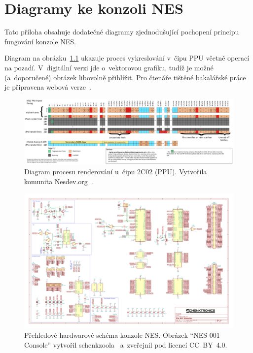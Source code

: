 \chapter{Diagramy ke konzoli NES}
\label{apx:ppu}

Tato příloha obsahuje dodatečné diagramy zjednodušující pochopení principu fungování konzole NES.

Diagram na obrázku~\ref{fig:ppu-renderovani} ukazuje proces vykreslování v~čipu PPU včetně operací na pozadí. V~digitální verzi jde o~vektorovou grafiku, tudíž je možné (a~doporučené) obrázek libovolně přiblížit. Pro čtenáře tištěné bakalářské práce je připravena webová verze~\cite{Nesdev:ppu-svg}.

\begin{figure}[p]
	\centering
	\includegraphics[width=0.98\textheight, angle=270]{images/ppudiag.pdf}
	\caption{Diagram procesu renderování u~čipu 2C02 (PPU). Vytvořila komunita Nesdev.org~\cite{Nesdev:ppu-svg}.}
	\label{fig:ppu-renderovani}
\end{figure}

\begin{figure}[p]
	\centering
	\includegraphics[width=0.92\textheight, angle=270]{images/NES-001.pdf}
	\caption{Přehledové hardwarové schéma konzole NES. Obrázek \enquote{NES-001 Console} vytvořil schenkzoola~\cite{schenkzoola2020:nes} a~zveřejnil pod licencí CC~BY~4.0.}
	\label{fig:nes001-hw}
\end{figure}

